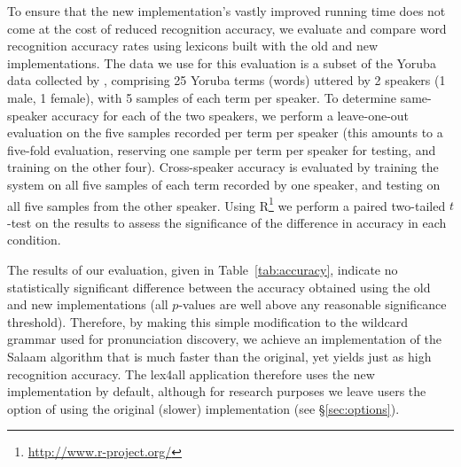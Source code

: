 \documentclass[11pt]{article}
\begin{document}
To ensure that the new implementation's vastly improved running time does not come at the cost of reduced recognition accuracy, we evaluate and compare word recognition accuracy rates using lexicons built with the old and new implementations. The data we use for this evaluation is a subset of the Yoruba data collected by , comprising 25 Yoruba terms (words) uttered by 2 speakers (1 male, 1 female), with 5 samples of each term per speaker. 
To determine same-speaker accuracy for each of the two speakers, we perform a leave-one-out evaluation on the five samples recorded per term per speaker (this amounts to a five-fold evaluation, reserving one sample per term per speaker for testing, and training on the other four). Cross-speaker accuracy is evaluated by training the system on all five samples of each term recorded by one speaker, and testing on all five samples from the other speaker.
Using R\footnote{\url{http://www.r-project.org/}} we perform a paired two-tailed $t$-test on the results to assess the significance of the difference in accuracy in each condition.

The results of our evaluation, given in Table~\ref{tab:accuracy}, indicate no statistically significant difference between the accuracy obtained using the old and new implementations (all $p$-values are well above any reasonable significance threshold). Therefore, by making this simple modification to the wildcard grammar used for pronunciation discovery, we achieve an implementation of the Salaam algorithm that is much faster than the original, yet yields just as high recognition accuracy. The lex4all application therefore uses the new implementation by default, although for research purposes we leave users the option of using the original (slower) implementation (see \S\ref{sec:options}).
\end{document}
